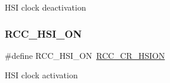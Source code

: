 H\+SI clock deactivation \mbox{\label{group___r_c_c___h_s_i___config_ga0bf09ef9e46d5da25cced7b3122f92f5}} 
\subsubsection{\texorpdfstring{R\+C\+C\+\_\+\+H\+S\+I\+\_\+\+ON}{RCC\_HSI\_ON}}
{\footnotesize\ttfamily \#define R\+C\+C\+\_\+\+H\+S\+I\+\_\+\+ON~\hyperlink{group___peripheral___registers___bits___definition_gaf4fcacf94a97f7d49a70e089b39cf474}{R\+C\+C\+\_\+\+C\+R\+\_\+\+H\+S\+I\+ON}}

H\+SI clock activation 